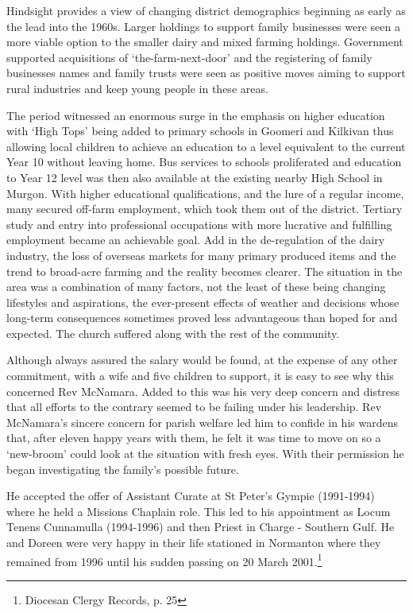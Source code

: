Hindsight provides a view of changing district demographics beginning as early as the lead into the 1960s. Larger holdings to support family businesses were seen a more viable option to the smaller dairy and mixed farming holdings. Government supported acquisitions of `the-farm-next-door' and the registering of family businesses names and family trusts were seen as positive moves aiming to support rural industries and keep young people in these areas.



The period witnessed an enormous surge in the emphasis on higher education with `High Tops' being added to primary schools in Goomeri and Kilkivan thus allowing local children to achieve an education to a level equivalent to the current Year 10 without leaving home. Bus services to schools proliferated and education to Year 12 level was then also available at the existing nearby High School in Murgon. With higher educational qualifications, and the lure of a regular income, many secured off-farm employment, which took them out of the district. Tertiary study and entry into professional occupations with more lucrative and fulfilling employment became an achievable goal. Add in the de-regulation of the dairy industry, the loss of overseas markets for many primary produced items and the trend to broad-acre farming and the reality becomes clearer. The situation in the area was a combination of many factors, not the least of these being changing lifestyles and aspirations, the ever-present effects of weather and decisions whose long-term consequences sometimes proved less advantageous than hoped for and expected. The church suffered along with the rest of the community.



Although always assured the salary would be found, at the expense of any other commitment, with a wife and five children to support, it is easy to see why this concerned Rev McNamara. Added to this was his very deep concern and distress that all efforts to the contrary seemed to be failing under his leadership. Rev McNamara's sincere concern for parish welfare led him to confide in his wardens that, after eleven happy years with them, he felt it was time to move on so a `new-broom' could look at the situation with fresh eyes. With their permission he began investigating the family's possible future.



He accepted the offer of Assistant Curate at St Peter's Gympie (1991-1994) where he held a Missions Chaplain role. This led to his appointment as Locum Tenens Cunnamulla (1994-1996) and then Priest in Charge - Southern Gulf. He and Doreen were very happy in their life stationed in Normanton where they remained from 1996 until his sudden passing on 20 March 2001.\footnote{Diocesan Clergy Records, p. 25}


